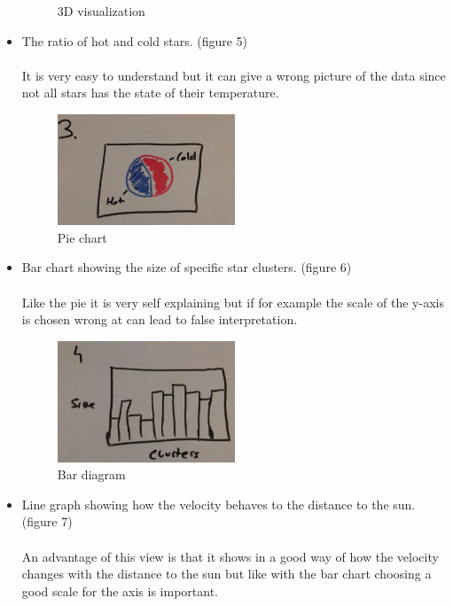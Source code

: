 \documentclass{article}
\begin{document}
\begin{itemize}
\begin{figure}[!h]
	\caption{3D visualization}
	\label{fig4}
\end{figure}
\item The ratio of hot and cold stars. (figure 5)\\
\\
It is very easy to understand but it can give a wrong picture of the data since not all stars has the state of their temperature.
\begin{figure}[!h]
\centering
\includegraphics[width=0.5\textwidth]{HotColdRatio.jpg}
	\caption{Pie chart}
	\label{fig5}
\end{figure}
\newpage\item Bar chart showing the size of specific star clusters. (figure 6)\\
\\
Like the pie it is very self explaining but if for example the scale of the y-axis is chosen wrong at can lead to false interpretation.
\begin{figure}[!h]
\centering
\includegraphics[width=0.5\textwidth]{SizeClusters.jpg}
	\caption{Bar diagram}
	\label{fig6}
\end{figure}
\item Line graph showing how the velocity behaves to the distance to the sun. (figure 7)\\
\\
An advantage of this view is that it shows in a good way of how the velocity changes with the distance to the sun but like with the bar chart choosing a good scale for the axis is important.


\end{itemize}
\end{document}
